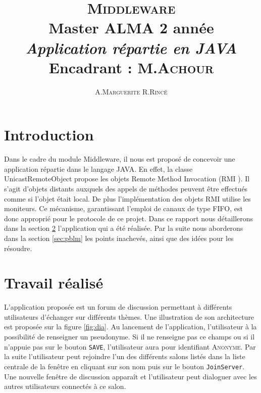 \documentclass[12pt]{article}
\title{ {\huge \textsc{Middleware}} \\  Master ALMA 2\up{eme} année  \\ \emph{Application répartie en JAVA}\\{\small Encadrant :  M.\textsc{Achour}}}
\author{A.\textsc{Marguerite} R.\textsc{Rincé}}
\begin{document}
\maketitle
\renewcommand{\labelitemi}{$\bullet$} 



\section{Introduction}\label{sec:intro}
Dans le cadre du module Middleware, il nous est proposé de concevoir une application répartie dans le langage JAVA. En effet, la classe UnicastRemoteObject propose les objets Remote Method Invocation (RMI ). Il s’agit d’objets \og distants \fg{} auxquels des appels de méthodes peuvent être effectués comme si l’objet était local. De plus l’implémentation des objets RMI utilise les moniteurs. Ce mécanisme, garantissant l’emploi de canaux de type FIFO,
est donc approprié pour le protocole de ce projet. Dans ce rapport nous détaillerons dans la section \ref{sec:trav} l'application qui a été réalisée. Par la suite nous aborderons dans la section \ref{sec:pblm} les points inachevés, ainsi que des idées pour les résoudre. 

\section{Travail réalisé}\label{sec:trav}
L'application proposée est un forum de discussion permettant à différents utilisateurs d'échanger sur différents thèmes. Une illustration de son architecture est proposée sur la figure \ref{fig:dia}. Au lancement de l'application, l'utilisateur à la possibilité de renseigner un pseudonyme. Si il ne renseigne pas ce champs ou si il n'appuie pas  sur le bouton \verb+SAVE+, l'utilisateur aura pour identifiant \textsc{Anonyme}. Par la suite l'utilisateur peut rejoindre l'un des différents \og salons \fg listés dans la liste centrale de la fenêtre en cliquant sur son nom puis sur le bouton \verb+JoinServer+. Une nouvelle fenêtre de discussion apparaît et l'utilisateur peut dialoguer avec les autres utilisateurs connectés à ce salon. 
\end{document}
